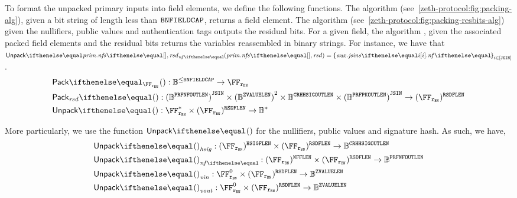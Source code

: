 To format the unpacked primary inputs into field elements, we define the following functions.
The algorithm \pack{}{} (see~\cref{zeth-protocol:fig:packing-alg}), given a bit string of length less than $\mathtt{BNFIELDCAP}$, returns a field element. The algorithm \packResBits{}{} (see~\cref{zeth-protocol:fig:packing-resbits-alg}) given the nullifiers, public values and authentication tags outputs the residual bits. For a given field, the algorithm \unpack{}{}, given the associated packed field elements and the residual bits returns the variables reassembled in binary strings. For instance, we have that $\unpack{\priminputs.\nfs{}, \resbits}{\nf{}} = \indexedset{\auxinputs.\jsins{i}.\nf{}}{i \in [\jsin]}$.
\begin{align*}
    &\pack{}{\FFx{\rBN}} : \BB^{\leq \bnFieldBitCap} \to \FFx{\rBN} \\
    &\packResBits{} : {(\BB^\prfNfOutLen)}^{\jsin} \times {(\BB^\zvalueLen)}^2 \times \BB^\crhhsigOutLen \times {(\BB^\prfPkOutLen)}^{\jsin} \to (\FFx{\rBN})^\resBitsFLen \\
    &\unpack{}{} : \FFx{\rBN}^* \times (\FFx{\rBN})^{\resBitsFLen} \to \BB^* \\
\end{align*}

More particularly, we use the function $\unpack{}{}$ for the nullifiers, public values and signature hash. As such, we have,
\begin{align*}
    &\unpack{}{}_{\hsig} : (\FFx{\rBN})^\hsigFLen \times (\FFx{\rBN})^{\resBitsFLen} \to \BB^\crhhsigOutLen \\
    &\unpack{}{}_{\nf{}} : (\FFx{\rBN})^\nfFLen \times (\FFx{\rBN})^{\resBitsFLen} \to \BB^\prfNfOutLen \\
    &\unpack{}{}_{\vin} : \FFx{\rBN}^0 \times (\FFx{\rBN})^{\resBitsFLen} \to \BB^\zvalueLen \\
    &\unpack{}{}_{\vout} : \FFx{\rBN}^0 \times (\FFx{\rBN})^{\resBitsFLen} \to \BB^\zvalueLen
\end{align*}

